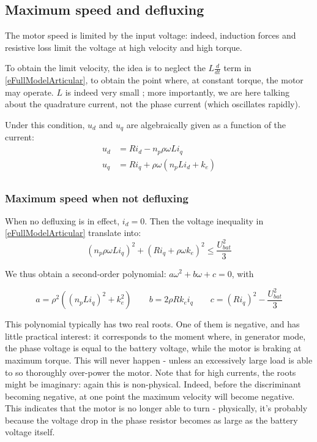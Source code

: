 \documentclass[a4paper,10pt]{article}
\begin{document}
\subsection{Maximum speed and defluxing} \label{sMaxSpeed}


The motor speed is limited by the input voltage: indeed, induction forces and resistive loss limit the voltage at high velocity and high torque.

To obtain the limit velocity, the idea is to neglect the $L \frac{d}{dt}$ term in \eqref{eFullModelArticular}, to obtain the point where, at constant torque, the motor may operate. $L$ is indeed very small ; more importantly, we are here talking about the quadrature current, not the phase current (which oscillates rapidly).

Under this condition, $u_d$ and $u_q$ are algebraically given as a function of the current:
\begin{equation}
\begin{aligned}
	u_d &= R i_d - n_p \rho \omega  L i_q \\
	u_q &= R i_q + \rho \omega  (n_p L i_d + k_e)\\
\end{aligned}
\label{eVelocityVoltage}
\end{equation}

\subsubsection{Maximum speed when not defluxing}

When no defluxing is in effect, $i_d = 0$. Then the voltage inequality in \eqref{eFullModelArticular} translate into:
\begin{equation}
	(n_p \rho \omega  L i_q) ^2 + (R i_q + \rho \omega  k_e)^2 \leq \frac{U_{bat}^2}{3}
\end{equation}

We thus obtain a second-order polynomial: $a \omega^2 + b \omega + c = 0$, with

\begin{equation}
	a = \rho^2 ((n_p L i_q)^2 + k_e^2) \qquad 
	b = 2 \rho R k_e i_q \qquad 
	c = (R i_q)^2 - \frac{U_{bat}^2}{3}
\end{equation}

This polynomial typically has two real roots. One of them is negative, and has little practical interest: it corresponds to the moment where, in generator mode, the phase voltage is equal to the battery voltage, while the motor is braking at maximum torque. This will never happen - unless an excessively large load is able to so thoroughly over-power the motor. Note that for high currents, the roots might be imaginary: again this is non-physical. Indeed, before the discriminant becoming negative, at one point the maximum velocity will become negative. This indicates that the motor is no longer able to turn - physically, it's probably because the voltage drop in the phase resistor becomes as large as the battery voltage itself.
\end{document}

